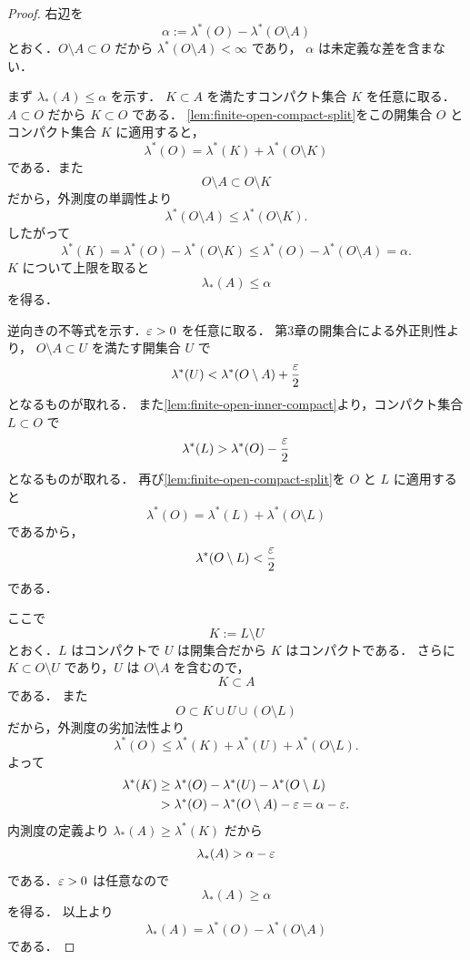\begin{proof}
右辺を
\[
\alpha:=\lambda^*(O)-\lambda^*(O\setminus A)
\]
とおく．$O\setminus A\subset O$ だから $\lambda^*(O\setminus A)<\infty$ であり，
$\alpha$ は未定義な差を含まない．

まず $\lambda_*(A)\le\alpha$ を示す．
$K\subset A$ を満たすコンパクト集合 $K$ を任意に取る．
$A\subset O$ だから $K\subset O$ である．
\cref{lem:finite-open-compact-split}をこの開集合 $O$ とコンパクト集合 $K$ に適用すると，
\[
\lambda^*(O)=\lambda^*(K)+\lambda^*(O\setminus K)
\]
である．また
\[
O\setminus A\subset O\setminus K
\]
だから，外測度の単調性より
\[
\lambda^*(O\setminus A)\le \lambda^*(O\setminus K).
\]
したがって
\[
\lambda^*(K)
=
\lambda^*(O)-\lambda^*(O\setminus K)
\le
\lambda^*(O)-\lambda^*(O\setminus A)
=\alpha.
\]
$K$ について上限を取ると
\[
\lambda_*(A)\le \alpha
\]
を得る．

逆向きの不等式を示す．$\varepsilon>0$ を任意に取る．
第3章の開集合による外正則性より，
$O\setminus A\subset U$ を満たす開集合 $U$ で
\[
\lambda^*(U)<\lambda^*(O\setminus A)+\frac{\varepsilon}{2}
\]
となるものが取れる．
また\cref{lem:finite-open-inner-compact}より，コンパクト集合 $L\subset O$ で
\[
\lambda^*(L)>\lambda^*(O)-\frac{\varepsilon}{2}
\]
となるものが取れる．
再び\cref{lem:finite-open-compact-split}を $O$ と $L$ に適用すると
\[
\lambda^*(O)=\lambda^*(L)+\lambda^*(O\setminus L)
\]
であるから，
\[
\lambda^*(O\setminus L)<\frac{\varepsilon}{2}
\]
である．

ここで
\[
K:=L\setminus U
\]
とおく．$L$ はコンパクトで $U$ は開集合だから $K$ はコンパクトである．
さらに $K\subset O\setminus U$ であり，$U$ は $O\setminus A$ を含むので，
\[
K\subset A
\]
である．
また
\[
O\subset K\cup U\cup (O\setminus L)
\]
だから，外測度の劣加法性より
\[
\lambda^*(O)
\le
\lambda^*(K)+\lambda^*(U)+\lambda^*(O\setminus L).
\]
よって
\begin{align*}
\lambda^*(K)
&\ge
\lambda^*(O)-\lambda^*(U)-\lambda^*(O\setminus L)\\
&>
\lambda^*(O)-\lambda^*(O\setminus A)-\varepsilon
=\alpha-\varepsilon.
\end{align*}
内測度の定義より $\lambda_*(A)\ge\lambda^*(K)$ だから
\[
\lambda_*(A)>\alpha-\varepsilon
\]
である．$\varepsilon>0$ は任意なので
\[
\lambda_*(A)\ge \alpha
\]
を得る．
以上より
\[
\lambda_*(A)=\lambda^*(O)-\lambda^*(O\setminus A)
\]
である．
\end{proof}

